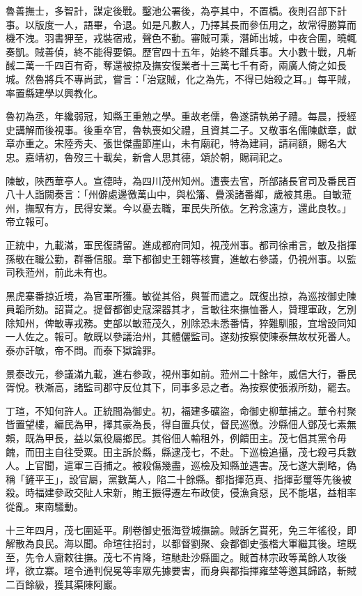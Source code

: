 \begin{pinyinscope}
魯善撫士，多智計，謀定後戰。鑿池公署後，為亭其中，不置橋。夜則召部下計事。以版度一人，語畢，令退。如是凡數人，乃擇其長而參伍用之，故常得勝算而機不洩。羽書狎至，戎裝宿戒，聲色不動。審賊可乘，潛師出城，中夜合圍，曉輒奏凱。賊善偵，終不能得要領。歷官四十五年，始終不離兵事。大小數十戰，凡斬馘二萬一千四百有奇，奪還被掠及撫安復業者十三萬七千有奇，兩廣人倚之如長城。然魯將兵不專尚武，嘗言：「治寇賊，化之為先，不得已始殺之耳。」每平賊，率置縣建學以興教化。

魯初為丞，年纔弱冠，知縣王重勉之學。重故老儒，魯遂請執弟子禮。每晨，授經史講解而後視事。後重卒官，魯執喪如父禮，且資其二子。又敬事名儒陳獻章，獻章亦重之。宋陸秀夫、張世傑盡節崖山，未有廟祀，特為建祠，請祠額，賜名大忠。嘉靖初，魯歿三十載矣，新會人思其德，頌於朝，賜祠祀之。

陳敏，陜西華亭人。宣德時，為四川茂州知州。遭喪去官，所部諸長官司及番民百八十人詣闕奏言：「州僻處邊徼萬山中，與松籓、疊溪諸番鄰，歲被其患。自敏蒞州，撫馭有方，民得安業。今以憂去職，軍民失所依。乞矜念遠方，還此良牧。」帝立報可。

正統中，九載滿，軍民復請留。進成都府同知，視茂州事。都司徐甫言，敏及指揮孫敬在職公勤，群番信服。章下都御史王翱等核實，進敏右參議，仍視州事。以監司秩蒞州，前此未有也。

黑虎寨番掠近境，為官軍所獲。敏從其俗，與誓而遣之。既復出掠，為巡按御史陳員韜所劾。詔貰之。提督都御史寇深器其才，言敏往來撫恤番人，贊理軍政，乞別除知州，俾敏專戎務。吏部以敏蒞茂久，別除恐未悉番情，猝難馴服，宜增設同知一人佐之。報可。敏既以參議治州，其體儷監司。遂劾按察使陳泰無故杖死番人。泰亦訐敏，帝不問。而泰下獄論罪。

景泰改元，參議滿九載，進右參政，視州事如前。蒞州二十餘年，威信大行，番民胥悅。秩漸高，諸監司郡守反位其下，同事多忌之者。為按察使張淑所劾，罷去。

丁瑄，不知何許人。正統間為御史。初，福建多礦盜，命御史柳華捕之。華令村聚皆置望樓，編民為甲，擇其豪為長，得自置兵仗，督民巡徼。沙縣佃人鄧茂七素無賴，既為甲長，益以氣役屬鄉民。其俗佃人輸租外，例饋田主。茂七倡其黨令毋餽，而田主自往受粟。田主訴於縣，縣逮茂七，不赴。下巡檢追攝，茂七殺弓兵數人。上官聞，遣軍三百捕之。被殺傷幾盡，巡檢及知縣並遇害。茂七遂大剽略，偽稱「鏟平王」，設官屬，黨數萬人，陷二十餘縣。都指揮范真、指揮彭璽等先後被殺。時福建參政交阯人宋新，賄王振得遷左布政使，侵漁貪惡，民不能堪，益相率從亂。東南騷動。

十三年四月，茂七圍延平。刷卷御史張海登城撫諭。賊訴乞貰死，免三年徭役，即解散為良民。海以聞。命瑄往招討，以都督劉聚、僉都御史張楷大軍繼其後。瑄既至，先令人齎敕往撫。茂七不肯降，瑄馳赴沙縣圖之。賊首林宗政等萬餘人攻後坪，欲立寨。瑄令通判倪冕等率眾先據要害，而身與都指揮雍埜等邀其歸路，斬賊二百餘級，獲其渠陳阿巖。


\end{pinyinscope}
